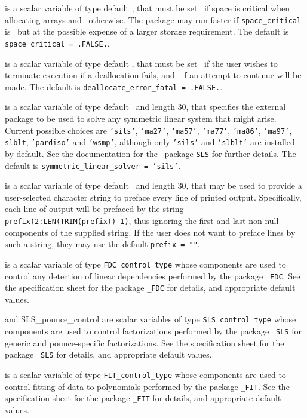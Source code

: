\documentclass{galahad}
\begin{document}
\begin{description}
 is a scalar variable of type default \logical,
that must be set \true\ if space is critical when allocating arrays
and  \false\ otherwise. The package may run faster if
{\tt space\_critical} is \false\ but at the possible expense of a larger
storage requirement. The default is {\tt space\_critical = .FALSE.}.

 is a scalar variable of type default \logical,
that must be set \true\ if the user wishes to terminate execution if
a deallocation  fails, and \false\ if an attempt to continue
will be made. The default is {\tt deallocate\_error\_fatal = .FALSE.}.

 is a scalar variable of type default \character\
and length 30, that specifies the external package to be used to
solve any symmetric linear system that might arise. Current possible
choices are {\tt 'sils'}, {\tt 'ma27'}, {\tt 'ma57'}, {\tt 'ma77'},
{\tt 'ma86'}, {\tt 'ma97'}, {\tt slblt}, {\tt 'pardiso'}
and {\tt 'wsmp'},
although only {\tt 'sils'} and {\tt 'slblt'} are installed by default.
See the documentation for the \galahad\ package {\tt SLS} for further details.
The default is {\tt symmetric\_linear\_solver = 'sils'}.

 is a scalar variable of type default \character\
and length 30, that may be used to provide a user-selected
character string to preface every line of printed output.
Specifically, each line of output will be prefaced by the string
{\tt prefix(2:LEN(TRIM(prefix))-1)},
thus ignoring the first and last non-null components of the
supplied string. If the user does not want to preface lines by such
a string, they may use the default {\tt prefix = ""}.

 is a scalar variable of type
{\tt FDC\_control\_type}
whose components are used to control any detection of linear dependencies
performed by the package
{\tt \libraryname\_FDC}.
See the specification sheet for the package
{\tt \libraryname\_FDC}
for details, and appropriate default values.

 and {SLS\_pounce\_control}
are scalar variables of type
{\tt SLS\_control\_type}
whose components are used to control factorizations
performed by the package
{\tt \libraryname\_SLS} for generic and pounce-specific factorizations.
See the specification sheet for the package
{\tt \libraryname\_SLS}
for details, and appropriate default values.

 is a scalar variable of type
{\tt FIT\_control\_type}
whose components are used to control fitting of data to polynomials
performed by the package
{\tt \libraryname\_FIT}.
See the specification sheet for the package
{\tt \libraryname\_FIT}
for details, and appropriate default values.


\end{description}
\end{document}
